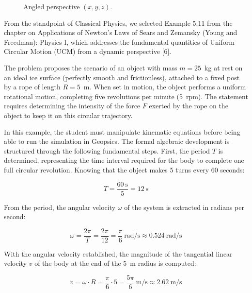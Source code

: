 \documentclass[conference,a4paper]{IEEEtran}
\begin{document}
\begin{figure}[h]
\centering
{}
\caption{Angled perspective $(x, y, z)$.}
\label{fig:angle}
\end{figure}

From the standpoint of Classical Physics, we selected Example 5:11 from the chapter on Applications of Newton's Laws of Sears and Zemansky (Young and Freedman): Physics I, which addresses the fundamental quantities of Uniform Circular Motion (UCM) from a dynamic perspective [6].

The problem proposes the scenario of an object with mass $m = 25$~kg at rest on an ideal ice surface (perfectly smooth and frictionless), attached to a fixed post by a rope of length $R = 5$~m. When set in motion, the object performs a uniform rotational motion, completing five revolutions per minute (5~rpm). The statement requires determining the intensity of the force $F$ exerted by the rope on the object to keep it on this circular trajectory.

In this example, the student must manipulate kinematic equations before being able to run the simulation in Geopsics. The formal algebraic development is structured through the following fundamental steps. First, the period $T$ is determined, representing the time interval required for the body to complete one full circular revolution. Knowing that the object makes 5 turns every 60 seconds:

\begin{equation*}
T = \frac{60~\text{s}}{5} = 12~\text{s}
\end{equation*}

From the period, the angular velocity $\omega$ of the system is extracted in radians per second:

\begin{equation*}
\omega = \frac{2\pi}{T} = \frac{2\pi}{12} = \frac{\pi}{6}~\text{rad/s} \approx 0.524~\text{rad/s}
\end{equation*}

With the angular velocity established, the magnitude of the tangential linear velocity $v$ of the body at the end of the 5~m radius is computed:

\begin{equation*}
v = \omega \cdot R = \frac{\pi}{6}\cdot 5 = \frac{5\pi}{6}~\text{m/s} \approx 2.62~\text{m/s}
\end{equation*}
\end{document}
